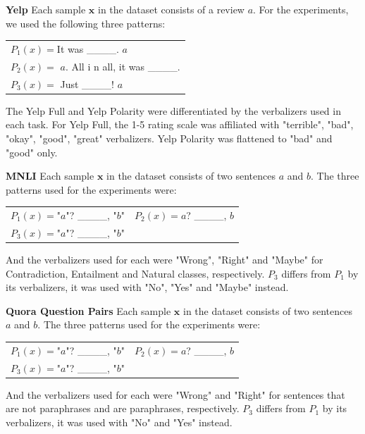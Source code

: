 \documentclass[11pt,a4paper]{article}
\begin{document}
\vspace{8pt}
\noindent \textbf{Yelp} \quad
Each sample $\textbf{x}$ in the dataset consists of a review $a$.
For the experiments, we used the following three patterns:
\begin{table}[H]
	\renewcommand{\arraystretch}{1.5}
	\begin{tabularx}{\textwidth}{l}
		$P_1(x)=$It was \_\_\_\_. $a$ \\
		$P_2(x)=$ $a$. All i n all, it was \_\_\_\_. \\
		$P_3(x)=$ Just \_\_\_\_! $a$  \\
	\end{tabularx}
\end{table}
The Yelp Full and Yelp Polarity were differentiated by the verbalizers used in each task.
For Yelp Full, the 1-5 rating scale was affiliated with "terrible", "bad", "okay", "good", "great" verbalizers.
Yelp Polarity was flattened to "bad" and "good" only.

\vspace{8pt}
\noindent \textbf{MNLI} \quad
Each sample $\textbf{x}$ in the dataset consists of two sentences $a$ and $b$.
The three patterns used for the experiments were:
\begin{table}[H]
	\renewcommand{\arraystretch}{1.5}
	\begin{tabularx}{\textwidth}{cc}
		$P_1(x)=$"$a$"? \_\_\_\_, "$b$" & $P_2(x)=$$a$? \_\_\_\_, $b$ \\
		$P_3(x)=$"$a$"? \_\_\_\_, "$b$" & \\
	\end{tabularx}
\end{table}
And the verbalizers used for each were "Wrong", "Right" and "Maybe" for Contradiction, Entailment and Natural classes, respectively.
$P_3$ differs from $P_1$ by its verbalizers, it was used with "No", "Yes" and "Maybe" instead.

\vspace{8pt}
\noindent \textbf{Quora Question Pairs} \quad
Each sample $\textbf{x}$ in the dataset consists of two sentences $a$ and $b$.
The three patterns used for the experiments were:
\begin{table}[H]
	\renewcommand{\arraystretch}{1.5}
	\begin{tabularx}{\textwidth}{cc}
		$P_1(x)=$"$a$"? \_\_\_\_, "$b$" & $P_2(x)=$$a$? \_\_\_\_, $b$ \\ 
		$P_3(x)=$"$a$"? \_\_\_\_, "$b$" & \\
	\end{tabularx}
\end{table}
And the verbalizers used for each were "Wrong" and "Right" for sentences that are not paraphrases and are paraphrases, respectively.
$P_3$ differs from $P_1$ by its verbalizers, it was used with "No" and "Yes" instead.
\end{document}

